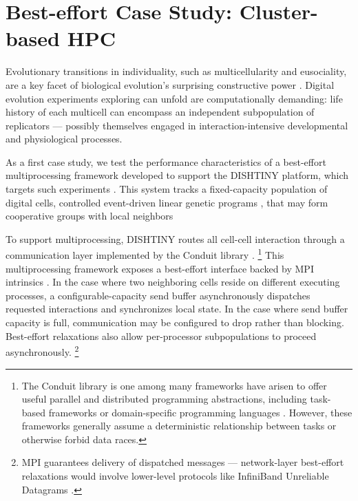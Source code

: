 \section{Best-effort Case Study: Cluster-based HPC} \label{moreno:sec:case1}



Evolutionary transitions in individuality, such as multicellularity and eusociality, are a key facet of biological evolution's surprising constructive power \cite{taylor2016open}.
Digital evolution experiments exploring can unfold are computationally demanding: life history of each multicell can encompass an independent subpopulation of replicators --- possibly themselves engaged in interaction-intensive developmental and physiological processes.

As a first case study, we test the performance characteristics of a best-effort multiprocessing framework developed to support the DISHTINY platform, which targets such experiments \cite{moreno2019toward}.
This system tracks a fixed-capacity population of digital cells, controlled event-driven linear genetic programs \cite{lalejini2018evolving}, that may form cooperative groups with local neighbors \cite{moreno2021exploring}

To support multiprocessing, DISHTINY routes all cell-cell interaction through a communication layer implemented by the Conduit library \cite{moreno2021conduit}.
\unskip\footnote{%
The Conduit library is one among many frameworks have arisen to offer useful parallel and distributed programming abstractions, including task-based frameworks \cite{kale1993charm++,bauer2012legion,blumofe1996cilk,reinders2007intel} or domain-specific programming languages \cite{el2006upc,chamberlain2007parallel}.
However, these frameworks generally assume a deterministic relationship between tasks or otherwise forbid data races.
}
This multiprocessing framework exposes a best-effort interface backed by MPI intrinsics \cite{gropp1996high}.
In the case where two neighboring cells reside on different executing processes, a configurable-capacity send buffer asynchronously dispatches requested interactions and synchronizes local state.
In the case where send buffer capacity is full, communication may be configured to drop rather than blocking.
Best-effort relaxations also allow per-processor subpopulations to proceed asynchronously.
\unskip\footnote{%
MPI guarantees delivery of dispatched messages --- network-layer best-effort relaxations would involve lower-level protocols like InfiniBand Unreliable Datagrams \cite{kashyap2006ip,koop2007high}.
}


